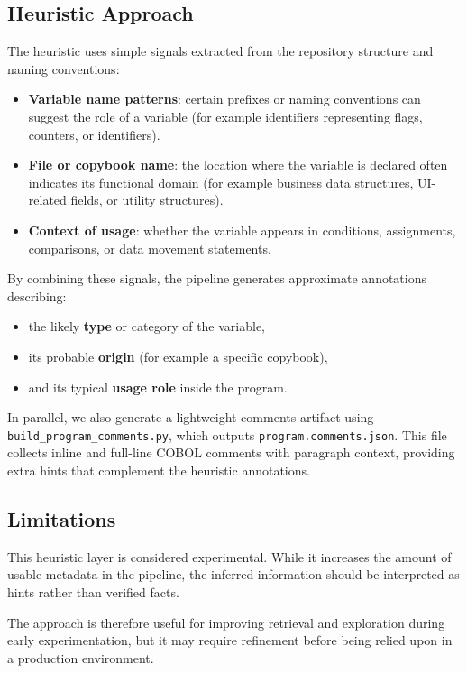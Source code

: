 \documentclass[11pt]{article}
\begin{document}
\subsection*{Heuristic Approach}

The heuristic uses simple signals extracted from the repository structure and naming conventions:

\begin{itemize}
\item \textbf{Variable name patterns}: certain prefixes or naming conventions can suggest the role of a variable (for example identifiers representing flags, counters, or identifiers).
\item \textbf{File or copybook name}: the location where the variable is declared often indicates its functional domain (for example business data structures, UI-related fields, or utility structures).
\item \textbf{Context of usage}: whether the variable appears in conditions, assignments, comparisons, or data movement statements.
\end{itemize}

By combining these signals, the pipeline generates approximate annotations describing:

\begin{itemize}
\item the likely \textbf{type} or category of the variable,
\item its probable \textbf{origin} (for example a specific copybook),
\item and its typical \textbf{usage role} inside the program.
\end{itemize}

In parallel, we also generate a lightweight comments artifact using \texttt{build\_program\_comments.py}, which outputs \texttt{program.comments.json}. This file collects inline and full-line COBOL comments with paragraph context, providing extra hints that complement the heuristic annotations.

\subsection*{Limitations}

This heuristic layer is considered experimental. While it increases the amount of usable metadata in the pipeline, the inferred information should be interpreted as hints rather than verified facts.

The approach is therefore useful for improving retrieval and exploration during early experimentation, but it may require refinement before being relied upon in a production environment.
\end{document}
